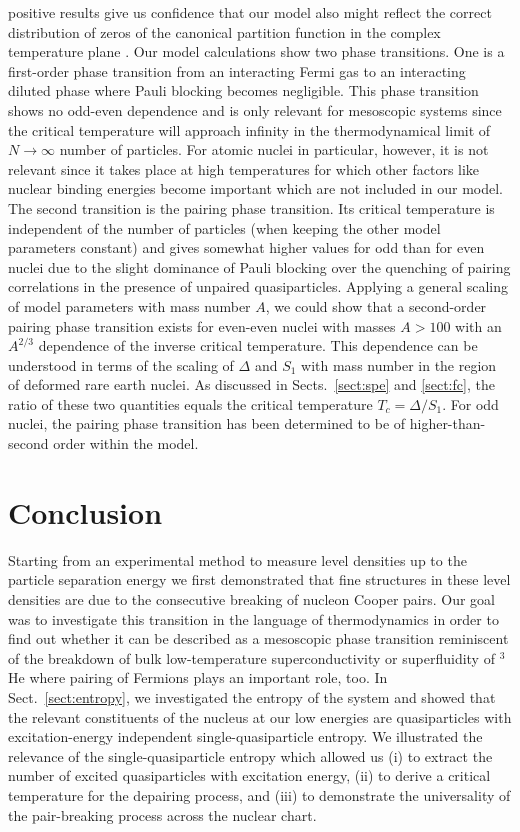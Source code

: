 \documentclass[sort&compress,final,numberedheadings]{aipproc}
\begin{document}
positive results give us confidence that our model also might reflect the 
correct distribution of zeros of the canonical partition function in the 
complex temperature plane \cite{SG02b}. Our model calculations show two phase 
transitions. One is a first-order phase transition from an interacting Fermi 
gas to an interacting diluted phase where Pauli blocking becomes negligible. 
This phase transition shows no odd-even dependence and is only relevant for 
mesoscopic systems since the critical temperature will approach infinity in the
thermodynamical limit of $N\rightarrow\infty$ number of particles. For atomic 
nuclei in particular, however, it is not relevant since it takes place at high 
temperatures for which other factors like nuclear binding energies become 
important which are not included in our model. The second transition is the 
pairing phase transition. Its critical temperature is independent of the number
of particles (when keeping the other model parameters constant) and gives 
somewhat higher values for odd than for even nuclei due to the slight dominance
of Pauli blocking over the quenching of pairing correlations in the presence of
unpaired quasiparticles. Applying a general scaling of model parameters with 
mass number $A$, we could show that a second-order pairing phase transition 
exists for even-even nuclei with masses $A>100$ with an $A^{2/3}$ dependence of
the inverse critical temperature. This dependence can be understood in terms of
the scaling of $\Delta$ and $S_1$ with mass number in the region of deformed 
rare earth nuclei. As discussed in Sects.\ \ref{sect:spe} and \ref{sect:fc}, 
the ratio of these two quantities equals the critical temperature 
$T_c=\Delta/S_1$. For odd nuclei, the pairing phase transition has been 
determined to be of higher-than-second order within the model.

\section{Conclusion}

Starting from an experimental method to measure level densities up to the 
particle separation energy we first demonstrated that fine structures in these 
level densities are due to the consecutive breaking of nucleon Cooper pairs. 
Our goal was to investigate this transition in the language of thermodynamics 
in order to find out whether it can be described as a mesoscopic phase 
transition reminiscent of the breakdown of bulk low-temperature 
superconductivity or superfluidity of $^3$He where pairing of Fermions plays an
important role, too. In Sect.\ \ref{sect:entropy}, we investigated the entropy 
of the system and showed that the relevant constituents of the nucleus at our 
low energies are quasiparticles with excitation-energy independent 
single-quasiparticle entropy. We illustrated the relevance of the 
single-quasiparticle entropy which allowed us (i) to extract the number of 
excited quasiparticles with excitation energy, (ii) to derive a critical 
temperature for the depairing process, and (iii) to demonstrate the 
universality of the pair-breaking process across the nuclear chart. 
\end{document}
